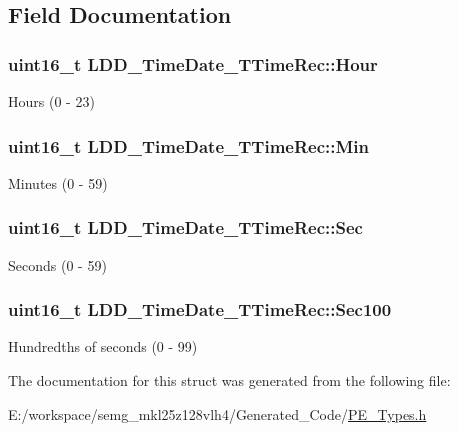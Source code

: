 \subsection{Field Documentation}
\hypertarget{struct_l_d_d___time_date___t_time_rec_ac741c5c14148b2d360bb09fedc6ebabd}{
\subsubsection[{Hour}]{\setlength{\rightskip}{0pt plus 5cm}uint16\-\_\-t L\-D\-D\-\_\-\-Time\-Date\-\_\-\-T\-Time\-Rec\-::\-Hour}}\label{struct_l_d_d___time_date___t_time_rec_ac741c5c14148b2d360bb09fedc6ebabd}
Hours (0 -\/ 23) \hypertarget{struct_l_d_d___time_date___t_time_rec_a7cea2c409e90bccdc33f19b093020373}{
\subsubsection[{Min}]{\setlength{\rightskip}{0pt plus 5cm}uint16\-\_\-t L\-D\-D\-\_\-\-Time\-Date\-\_\-\-T\-Time\-Rec\-::\-Min}}\label{struct_l_d_d___time_date___t_time_rec_a7cea2c409e90bccdc33f19b093020373}
Minutes (0 -\/ 59) \hypertarget{struct_l_d_d___time_date___t_time_rec_a05cccc86e89e5704b0460caaf2429f75}{
\subsubsection[{Sec}]{\setlength{\rightskip}{0pt plus 5cm}uint16\-\_\-t L\-D\-D\-\_\-\-Time\-Date\-\_\-\-T\-Time\-Rec\-::\-Sec}}\label{struct_l_d_d___time_date___t_time_rec_a05cccc86e89e5704b0460caaf2429f75}
Seconds (0 -\/ 59) \hypertarget{struct_l_d_d___time_date___t_time_rec_a2cd2e13e7c478f04ea1c4c460b104491}{
\subsubsection[{Sec100}]{\setlength{\rightskip}{0pt plus 5cm}uint16\-\_\-t L\-D\-D\-\_\-\-Time\-Date\-\_\-\-T\-Time\-Rec\-::\-Sec100}}\label{struct_l_d_d___time_date___t_time_rec_a2cd2e13e7c478f04ea1c4c460b104491}
Hundredths of seconds (0 -\/ 99) 

The documentation for this struct was generated from the following file\-:\begin{DoxyCompactItemize}
\item 
E\-:/workspace/semg\-\_\-mkl25z128vlh4/\-Generated\-\_\-\-Code/\hyperlink{_p_e___types_8h}{P\-E\-\_\-\-Types.\-h}\end{DoxyCompactItemize}
